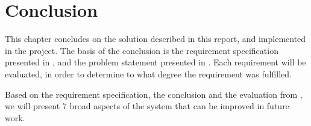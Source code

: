 \chapter{Conclusion}\label{chap:conclusion}

This chapter concludes on the solution described in this report, 
and implemented in the project. 
The basis of the conclusion is the requirement specification presented in , 
and the problem statement presented in . 
Each requirement will be evaluated, 
in order to determine to what degree the requirement was fulfilled.

Based on the requirement specification, 
the conclusion and the evaluation from , 
we will present \num{7} broad aspects of the system that can be improved in future work.



